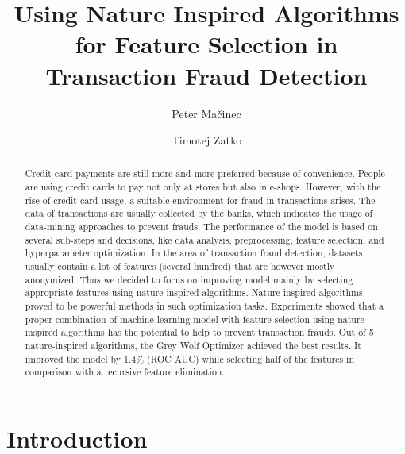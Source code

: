 \documentclass[runningheads]{llncs}
\begin{document}
%
\title{Using Nature Inspired Algorithms for Feature Selection in Transaction Fraud Detection}
%
%
\author{Peter Mačinec \and Timotej Zaťko}
%
%
%
\maketitle              %
%
\begin{abstract}
Credit card payments are still more and more preferred because of convenience. People are using credit cards to pay not only at stores but also in e-shops. However, with the rise of credit card usage, a suitable environment for fraud in transactions arises. The data of transactions are usually collected by the banks, which indicates the usage of data-mining approaches to prevent frauds. The performance of the model is based on several sub-steps and decisions, like data analysis, preprocessing, feature selection, and hyperparameter optimization. In the area of transaction fraud detection, datasets usually contain a lot of features (several hundred) that are however mostly anonymized. Thus we decided to focus on improving model mainly by selecting appropriate features using nature-inspired algorithms. Nature-inspired algorithms proved to be powerful methods in such optimization tasks. Experiments showed that a proper combination of machine learning model with feature selection using nature-inspired algorithms has the potential to help to prevent transaction frauds. Out of 5 nature-inspired algorithms, the Grey Wolf Optimizer achieved the best results. It improved the model by 1.4\% (ROC AUC) while selecting half of the features in comparison with a recursive feature elimination.

\end{abstract}
%
%
%
\section{Introduction}
\end{document}
